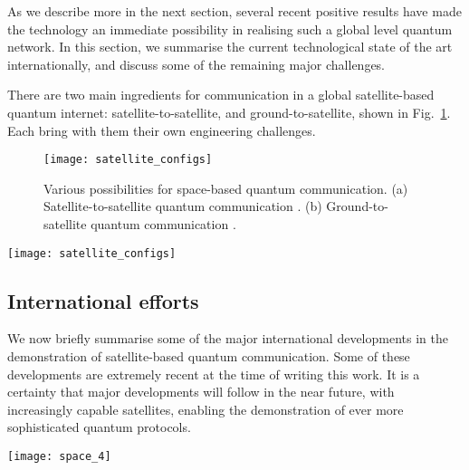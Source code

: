 As we describe more in the next section, several recent positive results have made the technology an immediate possibility in realising such a global level quantum network. In this section, we summarise the current technological state of the art internationally, and discuss some of the remaining major challenges.  

There are two main ingredients for communication in a global satellite-based quantum internet: satellite-to-satellite, and ground-to-satellite, shown in Fig.~\ref{fig:space_1}. Each bring with them their own engineering challenges.

\pubmode
\begin{figure}[!htbp]
\texttt{[image: satellite\_configs]}
\captionspacefig \caption{Various possibilities for space-based quantum communication. (a) Satellite-to-satellite quantum communication \cite{bib:byrnes2017lorentz}. (b) Ground-to-satellite quantum communication \cite{bib:armengol08}.}
\label{fig:space_1}
\end{figure}
\else
\begin{figure*}[!htbp]
\texttt{[image: satellite\_configs]}
\captionspacefig \caption{Various possibilities for space-based quantum communication. (a) Satellite-to-satellite quantum communication \cite{bib:byrnes2017lorentz}. (b) Ground-to-satellite quantum communication \cite{bib:armengol08}.}
\label{fig:space_1}
\end{figure*}
\fi 

%
%

\subsection{International efforts}

We now briefly summarise some of the major international developments in the demonstration of satellite-based quantum communication. Some of these developments are extremely recent at the time of writing this work. It is a certainty that major developments will follow in the near future, with increasingly capable satellites, enabling the demonstration of ever more sophisticated quantum protocols.

\begin{figure*}[!htbp]
\texttt{[image: space\_4]}
\captionspacefig \caption{The Chinese Micius quantum communications satellite. (a) Schematic of the satellite and ground stations used to observe the entangled photons \cite{bib:popkin17}. . (b) Attenuation during entanglement distribution from \cite{bib:yin2017satellite}. (c) Fidelities achieved for teleportation of various states as marked from \cite{bib:ren2017ground}.}
\label{fig:space_4}
\end{figure*}

